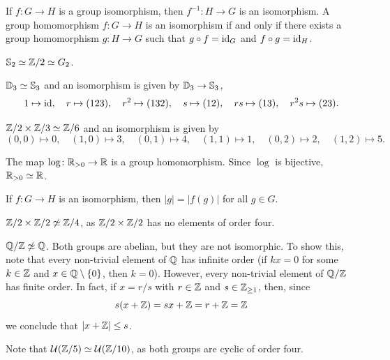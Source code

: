 If $f\colon G\to H$ is a group isomorphism, then
$f^{-1}\colon H\to G$ is an isomorphism. A group
homomorphism $f\colon G\to H$ is an isomorphism
if and only if there exists a group homomorphism 
$g\colon H\to G$ such that $g\circ f=\operatorname{id}_G$ and $f\circ g=\operatorname{id}_H$.

\begin{example}
$\mathbb{S}_2\simeq\mathbb{Z}/2\simeq G_2$.
\end{example}

\begin{example}
$\mathbb{D}_3\simeq\mathbb{S}_3$ and an isomorphism is given by $\mathbb{D}_3\to\mathbb{S}_3$,
\[
1\mapsto \operatorname{id},\quad
r\mapsto (123),\quad r^2\mapsto(132),\quad s\mapsto(12),\quad rs\mapsto(13),\quad r^2s\mapsto(23).
\]
\end{example}

\begin{example}
$\mathbb{Z}/2\times\mathbb{Z}/3\simeq\mathbb{Z}/6$ and an isomorphism is given by 
\[
(0,0)\mapsto 0,\quad (1,0)\mapsto 3,\quad
(0,1)\mapsto 4,\quad (1,1)\mapsto 1,\quad (0,2)\mapsto 2,\quad (1,2)\mapsto 5.
\]
\end{example}

\begin{example}
The map $\log\colon\mathbb{R}_{>0}\to\mathbb{R}$ is a group homomorphism. Since
$\log$ is bijective, 
$\mathbb{R}_{>0}\simeq\mathbb{R}$.
\end{example}

If $f\colon G\to H$ is an isomorphism, then
$|g|=|f(g)|$ for all $g\in G$. 

\begin{example}
\label{exa:order4}
$\mathbb{Z}/2\times\mathbb{Z}/2\not\simeq\mathbb{Z}/4$, as $\mathbb{Z}/2\times\mathbb{Z}/2$ has no elements of order four. 
\end{example}

\begin{example}
$\mathbb{Q}/\mathbb{Z}\not\simeq\mathbb{Q}$. Both groups are abelian, but they are not isomorphic. To show this, note that every non-trivial element of $\mathbb{Q}$ has infinite order (if $kx=0$ for some $k\in\mathbb{Z}$ and $x\in\mathbb{Q}\setminus\{0\}$, then
$k=0$). However, every non-trivial element of $\mathbb{Q}/\mathbb{Z}$ has finite order. In fact, if $x=r/s$ with $r\in\mathbb{Z}$ and $s\in\mathbb{Z}_{\ge1}$, then, since 
\[
s(x+\mathbb{Z})=sx+\mathbb{Z}=r+\mathbb{Z}=\mathbb{Z}
\]
we conclude that $|x+\mathbb{Z}|\leq s$.
\end{example}

\begin{example}
\label{exa:U(Z/5)}
Note that $\mathcal{U}(\mathbb{Z}/5)\simeq\mathcal{U}(\mathbb{Z}/10)$, as
both groups are cyclic of order four. 
\end{example}

